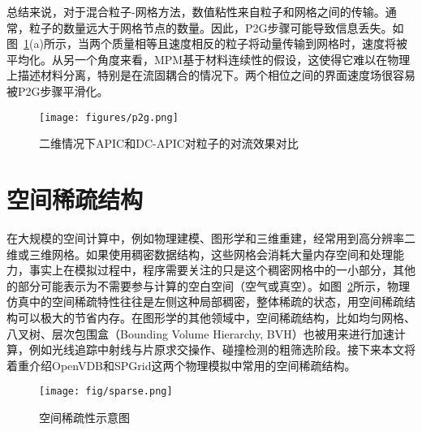 总结来说，对于混合粒子-网格方法，数值粘性来自粒子和网格之间的传输。通常，粒子的数量远大于网格节点的数量。因此，P2G步骤可能导致信息丢失。如图~\ref{fig:p2g}(a)所示，当两个质量相等且速度相反的粒子将动量传输到网格时，速度将被平均化。从另一个角度来看，MPM基于材料连续性的假设，这使得它难以在物理上描述材料分离，特别是在流固耦合的情况下。两个相位之间的界面速度场很容易被P2G步骤平滑化。

\begin{figure}[h]
    \centering
    \texttt{[image: figures/p2g.png]}
    \caption{二维情况下APIC和DC-APIC对粒子的对流效果对比}
    \label{fig:p2g}
\end{figure}

\section{空间稀疏结构}
在大规模的空间计算中，例如物理建模、图形学和三维重建，经常用到高分辨率二维或三维网格。如果使用稠密数据结构，这些网格会消耗大量内存空间和处理能力，事实上在模拟过程中，程序需要关注的只是这个稠密网格中的一小部分，其他的部分可能表示为不需要参与计算的空白空间（空气或真空）。如图~\ref{fig:sparse}所示，物理仿真中的空间稀疏特性往往是左侧这种局部稠密，整体稀疏的状态，用空间稀疏结构可以极大的节省内存。在图形学的其他领域中，空间稀疏结构，比如均匀网格、八叉树、层次包围盒（Bounding Volume Hierarchy, BVH）也被用来进行加速计算，例如光线追踪中射线与片原求交操作、碰撞检测的粗筛选阶段。接下来本文将着重介绍OpenVDB和SPGrid这两个物理模拟中常用的空间稀疏结构。
\begin{figure}[H]
    \centering
    \texttt{[image: fig/sparse.png]}
    \caption{空间稀疏性示意图}
    \label{fig:sparse}
\end{figure}

